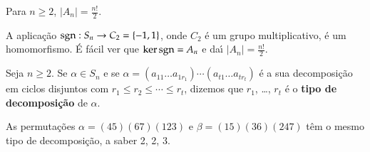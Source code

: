 \begin{proposicao}
	Para $n \ge 2$, $|A_n| = \frac{n!}{2}$.
\end{proposicao}
\begin{prova}
	A aplica\c{c}\~ao ${\rm sgn} : S_n \to C_2 = \{-1,1\}$, onde $C_2$ \'e um grupo multiplicativo, \'e um homomorfismo. \'E f\'acil ver que $\ker{\rm sgn} = A_n$ e da{\'\i} $|A_n| = \frac{n!}{2}$.
\end{prova}

\begin{definicao}
	Seja $n \ge 2$. Se $\alpha \in S_n$ e se $\alpha = (a_{11} \dots a_{1r_1})\cdots (a_{t1} \dots a_{tr_t})$ \'e a sua decomposi\c{c}\~ao em ciclos disjuntos com $r_1 \le r_2 \le \cdots \le r_t$, dizemos que $r_1$, \dots, $r_t$ \'e o \textbf{tipo de decomposi\c{c}\~ao} de $\alpha$.
\end{definicao}

\begin{exemplo}
	As permuta\c{c}\~oes $\alpha = (45)(67)(123)$ e $\beta = (15)(36)(247)$  t\^em o mesmo tipo de decomposi\c{c}\~ao, a saber 2, 2, 3.
\end{exemplo}

